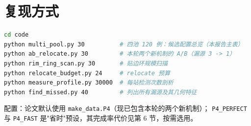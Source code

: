 \section{复现方式}

\begin{lstlisting}[language=bash]
cd code
python multi_pool.py 30          # 四池 120 例：候选配置总览（本报告主表）
python ab_relocate.py 30         # 本轮两个新机制的 A/B（漏源 3 -> 1）
python rim_ring_scan.py 30       # 贴边环规模扫描
python relocate_budget.py 24     # relocate 预算
python measure_profile.py 30000  # 每站检测次数剖析
python find_missed.py 40         # 列出所有漏源及其几何特征
\end{lstlisting}

配置：论文默认使用 \texttt{make\_data.P4}（现已包含本轮的两个新机制）；
\texttt{P4\_PERFECT} 与 \texttt{P4\_FAST} 是"省时"预设，其完成率代价见第 6 节，按需选用。


